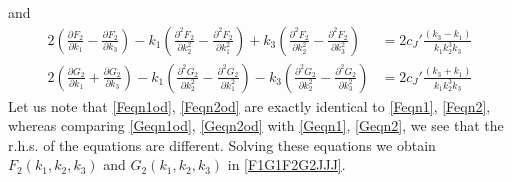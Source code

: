 \documentclass[a4paper,11pt]{article}
\begin{document}
and 
\begin{align}
2\left(\frac{\partial F_2}{\partial k_1}-\frac{\partial F_2}{\partial k_3}\right)-k_1\left(\frac{\partial^2 F_2}{\partial k_2^2}-\frac{\partial^2 F_2}{\partial k_1^2}\right)+k_3\left(\frac{\partial^2 F_2}{\partial k_2^2}-\frac{\partial^2 F_2}{\partial k_3^2}\right)&=2c_J'\frac{(k_3-k_1)}{k_1 k_2^3 k_3}\label{Feqn2od}\\[5 pt]
2\left(\frac{\partial G_2}{\partial k_1}+\frac{\partial G_2}{\partial k_3}\right)-k_1\left(\frac{\partial^2 G_2}{\partial k_2^2}-\frac{\partial^2 G_2}{\partial k_1^2}\right)-k_3\left(\frac{\partial^2 G_2}{\partial k_2^2}-\frac{\partial^2 G_2}{\partial k_3^2}\right)&=2c_J'\frac{(k_3+k_1)}{k_1 k_2^3 k_3}\label{Geqn2od}
\end{align}
Let us note that \eqref{Feqn1od}, \eqref{Feqn2od} are exactly identical to \eqref{Feqn1}, \eqref{Feqn2}, whereas comparing \eqref{Geqn1od}, \eqref{Geqn2od} with \eqref{Geqn1}, \eqref{Geqn2}, we see that the r.h.s. of the equations are different. Solving these equations we obtain $F_2(k_1, k_2, k_3)$ and $G_2(k_1, k_2, k_3)$ in \eqref{F1G1F2G2JJJ}.




\end{document}
